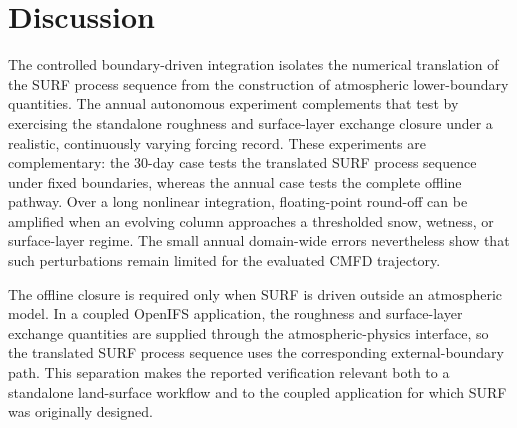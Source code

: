 \documentclass[gmd, manuscript]{copernicus}
\begin{document}

\introduction









\clearpage


\clearpage




\section{Discussion}

The controlled boundary-driven integration isolates the numerical translation of the SURF process
sequence from the construction of atmospheric lower-boundary quantities. The
annual autonomous experiment complements that test by exercising the
standalone roughness and surface-layer exchange closure under a realistic,
continuously varying forcing
record. These experiments are complementary: the 30-day case tests the
translated SURF process sequence under fixed boundaries, whereas the annual
case tests
the complete offline pathway. Over a long nonlinear integration, floating-point round-off can be
amplified when an evolving column approaches a thresholded snow, wetness, or
surface-layer regime. The small annual domain-wide errors nevertheless show
that such perturbations remain limited for the evaluated CMFD trajectory.

The offline closure is required only when SURF is driven outside an atmospheric
model. In a coupled OpenIFS application, the roughness and surface-layer
exchange quantities are supplied
through the atmospheric-physics interface, so the translated SURF process
sequence uses the corresponding external-boundary path. This separation makes the reported
verification relevant both to a standalone land-surface workflow and to the
coupled application for which SURF was originally designed.
\end{document}
